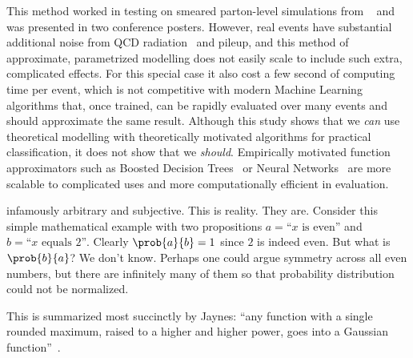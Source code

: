 This method worked in testing on smeared parton-level simulations from
\madgraph~\cite{Alwall:2014hca} and was presented in two conference posters.
However, real events have substantial additional noise from QCD
radiation~\cite{PhysRevD.83.074010} and pileup, and this method of approximate,
parametrized modelling does not easily scale to include such extra, complicated
effects.
For this special case it also cost a few second of computing time per event,
which is not competitive with modern Machine Learning algorithms that, once
trained, can be rapidly evaluated over many events and should approximate
the same result.
Although this study shows that we \emph{can} use theoretical modelling
with theoretically motivated algorithms for practical classification, it does
not show that we \emph{should}.
Empirically motivated function approximators such as
Boosted Decision Trees~\cite{xgboost} or
Neural Networks~\cite{MurphyKevinP.2012Mlap} are more scalable to complicated
uses and more computationally efficient in evaluation.


infamously arbitrary and subjective. This is reality. They are.
Consider this simple mathematical example with two propositions
$a=\textrm{``}x\textrm{ is even''}$ and
$b=\textrm{``}x\textrm{ equals }2\textrm{''}$.
Clearly $\prob{a}{b} = 1$ since $2$ is indeed even.
But what is $\prob{b}{a}$? We don't know. Perhaps one could argue symmetry
across all even numbers, but there are infinitely many of them so that
probability distribution could not be normalized.

\TODO{\ldots}

This is summarized most succinctly by Jaynes:
``any function with a single rounded maximum, raised to a higher and higher
power, goes into a Gaussian function''~\cite{jaynes2003probability}.
